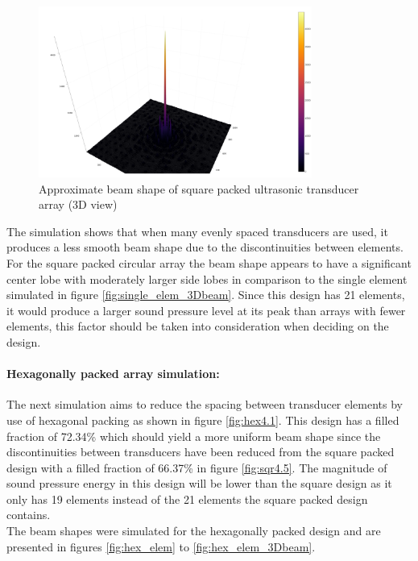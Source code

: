 \begin{figure}[ht!]
    \centering
    \includegraphics[width=0.8\textwidth]{Figures/arraySim/sqr/circ_sqr_beam3d.png}
    \caption{Approximate beam shape of square packed ultrasonic transducer array (3D view)}
    \label{fig:sqr_elem_3Dbeam}
\end{figure}

The simulation shows that when many evenly spaced transducers are used, it produces a less smooth beam shape due to the discontinuities between elements. For the square packed circular array the beam shape appears to have a significant center lobe with moderately larger side lobes in comparison to the single element simulated in figure \ref{fig:single_elem_3Dbeam}. Since this design has 21 elements, it would produce a larger sound pressure level at its peak than arrays with fewer elements, this factor should be taken into consideration when deciding on the design.\\

\paragraph{Hexagonally packed array simulation:}
The next simulation aims to reduce the spacing between transducer elements by use of hexagonal packing as shown in figure \ref{fig:hex4.1}. This design has a filled fraction of 72.34\% which should yield a more uniform beam shape since the discontinuities between transducers have been reduced from the square packed design with a filled fraction of 66.37\% in figure \ref{fig:sqr4.5}. The magnitude of sound pressure energy in this design will be lower than the square design as it only has 19 elements instead of the 21 elements the square packed design contains.\\
The beam shapes were simulated for the hexagonally packed design and are presented in figures \ref{fig:hex_elem} to \ref{fig:hex_elem_3Dbeam}.

